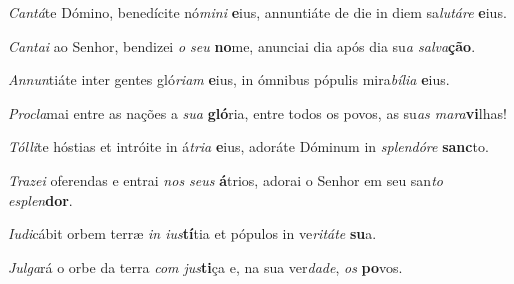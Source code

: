 \begin{greenumerate}
  \setcounter{enumi}{1}


  \item \textit{Cantá}te Dómino, benedícite nó\textit{mini} \textbf{e}ius, {\GreStar} annuntiáte de die in diem sa\textit{lutáre} \textbf{e}ius. 

  \switchcolumn\setcounter{enumi}{1}

  \item \textit{Cantai} ao Senhor, bendizei \textit{o seu} \textbf{no}me, {\GreStar} anunciai dia após dia su\textit{a salva}\textbf{ção}. 

  \switchcolumn*


  \item \textit{Annun}tiáte inter gentes gló\textit{riam} \textbf{e}ius, {\GreStar} in ómnibus pópulis mira\textit{bília} \textbf{e}ius. 

  \switchcolumn%

  \item \textit{Procla}mai entre as nações a \textit{sua} \textbf{gló}ria, {\GreStar} entre todos os povos, as su\textit{as mara}\textbf{vi}lhas! 

  \switchcolumn*


  \item \textit{Tólli}te hóstias et intróite in á\textit{tria} \textbf{e}ius, {\GreStar} adoráte Dóminum in \textit{splendóre} \textbf{sanc}to. 

  \switchcolumn%

  \item \textit{Trazei} oferendas e entrai \textit{nos seus} \textbf{á}trios, {\GreStar} adorai o Senhor em seu san\textit{to esplen}\textbf{dor}. 

  \switchcolumn*


  \item \textit{Iudi}cábit orbem terræ \textit{in ius}\textbf{tí}tia {\GreStar} et pópulos in ve\textit{ritáte} \textbf{su}a. 

  \switchcolumn%

  \item \textit{Julga}rá o orbe da terra \textit{com jus}\textbf{ti}ça {\GreStar} e, na sua ver\textit{dade}, \textit{os} \textbf{po}vos. 
\end{greenumerate}